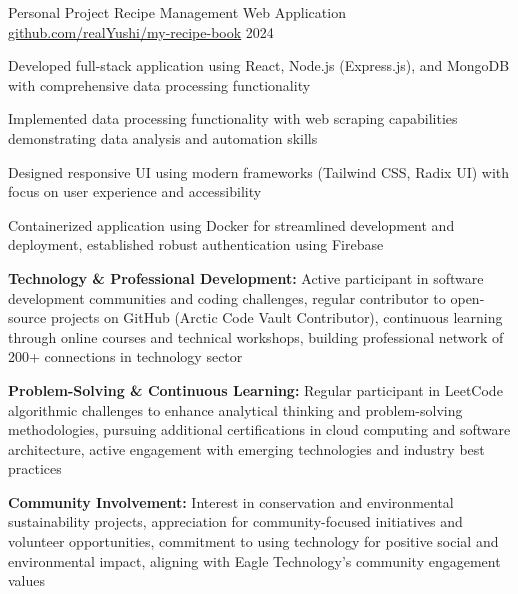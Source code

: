 \documentclass[11pt, a4paper]{awesome-cv}
\begin{document}
\begin{cventries}
  \cventry
    {Personal Project} %
    {Recipe Management Web Application} %
    {\href{https://github.com/realYushi/my-recipe-book}{github.com/realYushi/my-recipe-book}} %
    {2024} %
    {
      \begin{cvitems}
        \item {Developed full-stack application using React, Node.js (Express.js), and MongoDB with comprehensive data processing functionality}
        \item {Implemented data processing functionality with web scraping capabilities demonstrating data analysis and automation skills}
        \item {Designed responsive UI using modern frameworks (Tailwind CSS, Radix UI) with focus on user experience and accessibility}
        \item {Containerized application using Docker for streamlined development and deployment, established robust authentication using Firebase}
      \end{cvitems}
    }
\end{cventries}

\begin{cvhonors}
\end{cvhonors}

\begin{cvitems}
  \item {\textbf{Technology \& Professional Development:} Active participant in software development communities and coding challenges, regular contributor to open-source projects on GitHub (Arctic Code Vault Contributor), continuous learning through online courses and technical workshops, building professional network of 200+ connections in technology sector}
  \item {\textbf{Problem-Solving \& Continuous Learning:} Regular participant in LeetCode algorithmic challenges to enhance analytical thinking and problem-solving methodologies, pursuing additional certifications in cloud computing and software architecture, active engagement with emerging technologies and industry best practices}
  \item {\textbf{Community Involvement:} Interest in conservation and environmental sustainability projects, appreciation for community-focused initiatives and volunteer opportunities, commitment to using technology for positive social and environmental impact, aligning with Eagle Technology's community engagement values}
\end{cvitems}
\end{document}
